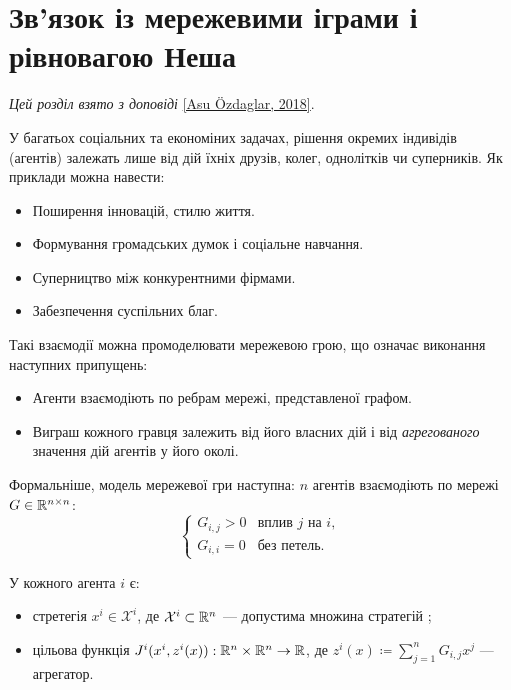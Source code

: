\section{Зв'язок із мережевими іграми і рівновагою Неша}

\emph{Цей розділ взято з доповіді} \href{https://simons.berkeley.edu/talks/asu-ozdaglar-3-28-18}{[Asu \"Ozdaglar, 2018]}. \medskip

У багатьох соціальних та економіних задачах, рішення окремих індивідів (агентів) залежать лише від дій їхніх друзів, колег, однолітків чи суперників. Як приклади можна навести:
\begin{itemize}
    \item Поширення інновацій, стилю життя.
    \item Формування громадських думок і соціальне навчання.
    \item Суперництво між конкурентними фірмами.
    \item Забезпечення суспільних благ.
\end{itemize}

Такі взаємодії можна промоделювати мережевою грою, що означає виконання наступних припущень:
\begin{itemize}
    \item Агенти взаємодіють по ребрам мережі, представленої графом.
    \item Виграш кожного гравця залежить від його власних дій і від \emph{агрегованого} значення дій агентів у його околі.
\end{itemize}

Формальніше, модель мережевої гри наступна: $n$ агентів взаємодіють по мережі $G \in \mathbb{R}^{n \times n}$:
\begin{equation}
    \begin{cases}
        G_{i,j} > 0 & \text{вплив }j\text{ на }i, \\
        G_{i,i} = 0 & \text{без петель}.
    \end{cases}
\end{equation}

У кожного агента $i$ є:
\begin{itemize}
    \item стретегія $x^i \in \mathcal{X}^i$, де $\mathcal{X}^i \subset \mathbb{R}^n$ --- допустима множина стратегій ;
    \item цільова функція $J^i(x^i, z^i(x)): \mathbb{R}^n \times \mathbb{R}^n \to \mathbb{R}$, де $z^i(x) \coloneqq \sum_{j = 1}^n G_{i,j} x^j$ --- агрегатор.
\end{itemize}

